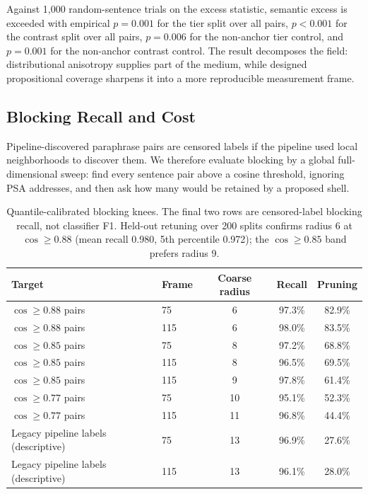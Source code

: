 \documentclass[11pt]{article}
\begin{document}
Against 1,000 random-sentence trials on the excess statistic, semantic excess is exceeded with empirical $p=0.001$ for the tier split over all pairs, $p<0.001$ for the contrast split over all pairs, $p=0.006$ for the non-anchor tier control, and $p=0.001$ for the non-anchor contrast control. The result decomposes the field: distributional anisotropy supplies part of the medium, while designed propositional coverage sharpens it into a more reproducible measurement frame.

\subsection{Blocking Recall and Cost}

Pipeline-discovered paraphrase pairs are censored labels if the pipeline used local neighborhoods to discover them. We therefore evaluate blocking by a global full-dimensional sweep: find every sentence pair above a cosine threshold, ignoring PSA addresses, and then ask how many would be retained by a proposed shell.

\begin{table}[t]
\centering
\small
\begin{tabular}{@{}llccc@{}}
\toprule
Target & Frame & Coarse radius & Recall & Pruning \\
\midrule
$\cos\geq0.88$ pairs & 75 & 6 & 97.3\% & 82.9\% \\
$\cos\geq0.88$ pairs & 115 & 6 & 98.0\% & 83.5\% \\
$\cos\geq0.85$ pairs & 75 & 8 & 97.2\% & 68.8\% \\
$\cos\geq0.85$ pairs & 115 & 8 & 96.5\% & 69.5\% \\
$\cos\geq0.85$ pairs & 115 & 9 & 97.8\% & 61.4\% \\
$\cos\geq0.77$ pairs & 75 & 10 & 95.1\% & 52.3\% \\
$\cos\geq0.77$ pairs & 115 & 11 & 96.8\% & 44.4\% \\
Legacy pipeline labels (descriptive) & 75 & 13 & 96.9\% & 27.6\% \\
Legacy pipeline labels (descriptive) & 115 & 13 & 96.1\% & 28.0\% \\
\bottomrule
\end{tabular}
\caption{Quantile-calibrated blocking knees. The final two rows are censored-label blocking recall, not classifier F1. Held-out retuning over 200 splits confirms radius 6 at $\cos\geq0.88$ (mean recall 0.980, 5th percentile 0.972); the $\cos\geq0.85$ band prefers radius 9.}
\label{tab:blocking}
\end{table}
\end{document}
